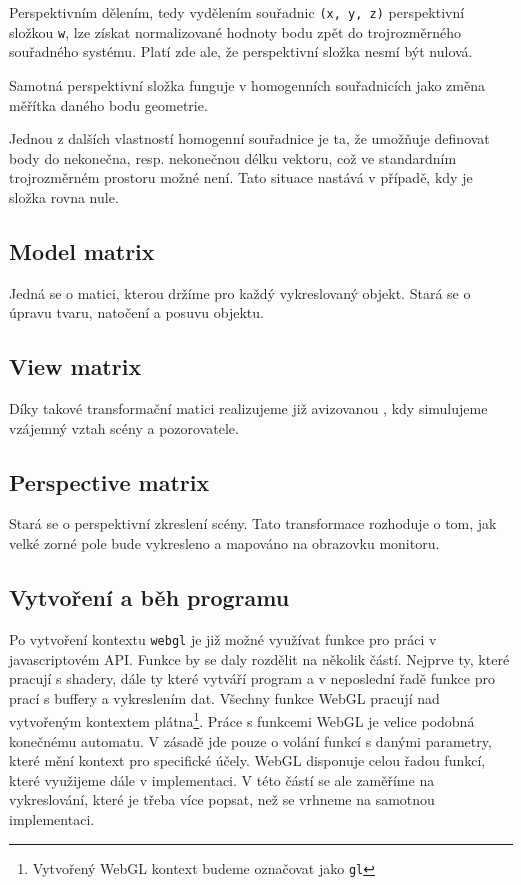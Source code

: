 Perspektivním dělením, tedy vydělením souřadnic \texttt{(x, y, z)} perspektivní složkou \texttt{w}, lze získat normalizované hodnoty bodu zpět do trojrozměrného souřadného systému. Platí zde ale, že perspektivní složka nesmí být nulová. 

Samotná perspektivní složka funguje v homogenních souřadnicích jako změna měřítka daného bodu geometrie.

Jednou z dalších vlastností homogenní souřadnice je ta, že umožňuje definovat body do nekonečna, resp. nekonečnou délku vektoru, což ve standardním trojrozměrném prostoru možné není. Tato situace nastává v případě, kdy je složka rovna nule.

\subsection{Model matrix}
Jedná se o matici, kterou držíme pro každý vykreslovaný objekt. Stará se o úpravu tvaru, natočení a posuvu objektu.

\subsection{View matrix}
Díky takové transformační matici realizujeme již avizovanou , kdy simulujeme vzájemný vztah scény a pozorovatele.

\subsection{Perspective matrix}
Stará se o perspektivní zkreslení scény. Tato transformace rozhoduje o tom, jak velké zorné pole bude vykresleno a mapováno 
na obrazovku monitoru. 

\newpage

\subsection{Vytvoření a běh programu}
Po vytvoření kontextu \texttt{webgl} je již možné využívat funkce pro práci v javascriptovém API. Funkce by se daly rozdělit na několik částí. Nejprve ty, které pracují s shadery, dále ty které vytváří program a v neposlední řadě funkce pro prací s buffery a vykreslením dat. Všechny funkce WebGL pracují nad vytvořeným kontextem plátna\footnote{Vytvořený WebGL kontext budeme označovat jako \texttt{gl}}. Práce s funkcemi WebGL je velice podobná konečnému automatu. V zásadě jde pouze o volání funkcí s danými parametry, které mění kontext pro specifické účely. WebGL disponuje celou řadou funkcí, které využijeme dále v implementaci. V této částí se ale zaměříme na vykreslování, které je třeba více popsat, než se vrhneme na samotnou implementaci. 

